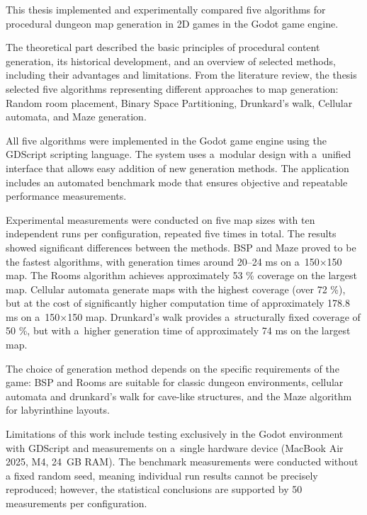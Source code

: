 \documentclass[
   program=itk,
   biblatex,
   figures=true,
   tables=true,
   glossaries,
   index
]{kidiplom}
\begin{document}
\begin{kiconclusions}[english]
This thesis implemented and experimentally compared five algorithms for procedural dungeon map generation in 2D games in the Godot game engine.

The theoretical part described the basic principles of procedural content generation, its historical development, and an overview of selected methods, including their advantages and limitations. From the literature review, the thesis selected five algorithms representing different approaches to map generation: Random room placement, Binary Space Partitioning, Drunkard's walk, Cellular automata, and Maze generation.

All five algorithms were implemented in the Godot game engine using the GDScript scripting language. The system uses a~modular design with a~unified interface that allows easy addition of new generation methods. The application includes an automated benchmark mode that ensures objective and repeatable performance measurements.

Experimental measurements were conducted on five map sizes with ten independent runs per configuration, repeated five times in total. The results showed significant differences between the methods. BSP and Maze proved to be the fastest algorithms, with generation times around 20--24 ms on a~150$\times$150 map. The Rooms algorithm achieves approximately 53 \% coverage on the largest map. Cellular automata generate maps with the highest coverage (over 72 \%), but at the cost of significantly higher computation time of approximately 178.8 ms on a~150$\times$150 map. Drunkard's walk provides a~structurally fixed coverage of 50 \%, but with a~higher generation time of approximately 74 ms on the largest map.

The choice of generation method depends on the specific requirements of the game: BSP and Rooms are suitable for classic dungeon environments, cellular automata and drunkard's walk for cave-like structures, and the Maze algorithm for labyrinthine layouts.

Limitations of this work include testing exclusively in the Godot environment with GDScript and measurements on a~single hardware device (MacBook Air 2025, M4, 24~GB RAM). The benchmark measurements were conducted without a fixed random seed, meaning individual run results cannot be precisely reproduced; however, the statistical conclusions are supported by 50 measurements per configuration.
\end{kiconclusions}
\end{document}
